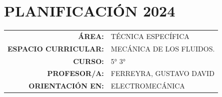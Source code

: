 \documentclass[a4paper]{article}
\newcommand{\ano}{2024} %
\begin{document}
\section*{\centering PLANIFICACIÓN \ano}

\begin{tabular}{r l}
     
\textbf{ÁREA:}&TÉCNICA ESPECÍFICA \\

\textbf{ESPACIO CURRICULAR:} &MECÁNICA DE LOS FLUIDOS. \\

\textbf{CURSO:}&5° 3°\\

\textbf{PROFESOR/A:}& FERREYRA, GUSTAVO DAVID\\

\textbf{ORIENTACIÓN EN:} & ELECTROMECÁNICA  \\
     
\end{tabular}
\end{document}
